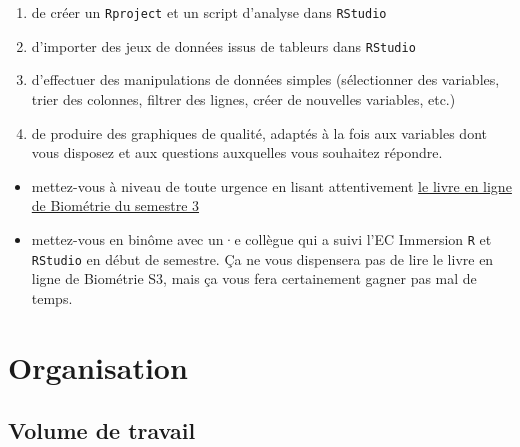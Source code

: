 \documentclass[
  a4paper,
  DIV=11,
  numbers=noendperiod,
  oneside]{scrreprt}
\providecommand{\tightlist}{%
  \setlength{\itemsep}{0pt}\setlength{\parskip}{0pt}}\usepackage{longtable,booktabs,array}
\begin{document}
\begin{enumerate}
\def\labelenumi{\arabic{enumi}.}
\tightlist
\item
  de créer un \texttt{Rproject} et un script d'analyse dans
  \texttt{RStudio}
\item
  d'importer des jeux de données issus de tableurs dans \texttt{RStudio}
\item
  d'effectuer des manipulations de données simples (sélectionner des
  variables, trier des colonnes, filtrer des lignes, créer de nouvelles
  variables, etc.)
\item
  de produire des graphiques de qualité, adaptés à la fois aux variables
  dont vous disposez et aux questions auxquelles vous souhaitez
  répondre.
\end{enumerate}

\begin{tcolorbox}[enhanced jigsaw, toprule=.15mm, coltitle=black, colframe=quarto-callout-warning-color-frame, titlerule=0mm, leftrule=.75mm, opacityback=0, bottomrule=.15mm, title=\textcolor{quarto-callout-warning-color}{\faExclamationTriangle}\hspace{0.5em}{Si ces pré-requis ne sont pas maîtrisés}, colbacktitle=quarto-callout-warning-color!10!white, breakable, colback=white, left=2mm, toptitle=1mm, arc=.35mm, bottomtitle=1mm, rightrule=.15mm, opacitybacktitle=0.6]

\begin{itemize}
\tightlist
\item
  mettez-vous à niveau de toute urgence en lisant attentivement
  \href{https://besibo.github.io/BiometrieS3/}{le livre en ligne de
  Biométrie du semestre 3}
\item
  mettez-vous en binôme avec un·e collègue qui a suivi l'EC Immersion
  \texttt{R} et \texttt{RStudio} en début de semestre. Ça ne vous
  dispensera pas de lire le livre en ligne de Biométrie S3, mais ça vous
  fera certainement gagner pas mal de temps.
\end{itemize}

\end{tcolorbox}

\hypertarget{organisation}{%
\section*{Organisation}\label{organisation}}

\hypertarget{volume-de-travail}{%
\subsection*{Volume de travail}\label{volume-de-travail}}
\end{document}
